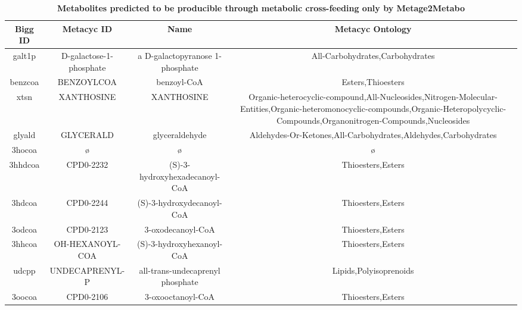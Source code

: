 \documentclass[../main.tex]{subfiles}
\begin{document}
\begin{table}[H]
\centering
\begin{adjustbox}{width=1.2\textwidth}
\begin{tabular}{|c|c|c|c|}
\hline
Bigg ID & Metacyc ID & Name & Metacyc Ontology  \\
\hline
galt1p&	D-galactose-1-phosphate&	a D-galactopyranose 1-phosphate	&All-Carbohydrates,Carbohydrates\\
benzcoa&	BENZOYLCOA&	benzoyl-CoA&	Esters,Thioesters\\
xtsn&	XANTHOSINE&	XANTHOSINE	&\begin{minipage}[t]{0.8\linewidth}Organic-heterocyclic-compound,All-Nucleosides,Nitrogen-Molecular-Entities,Organic-heteromonocyclic-compounds,Organic-Heteropolycyclic-Compounds,Organonitrogen-Compounds,Nucleosides\end{minipage}\\
glyald&	GLYCERALD&	glyceraldehyde	&Aldehydes-Or-Ketones,All-Carbohydrates,Aldehydes,Carbohydrates\\
3hocoa&	ø	&	ø	&	ø\\
3hhdcoa	&CPD0-2232	&(S)-3-hydroxyhexadecanoyl-CoA	&Thioesters,Esters\\
3hdcoa&	CPD0-2244	&(S)-3-hydroxydecanoyl-CoA	&Thioesters,Esters\\
3odcoa&	CPD0-2123&	3-oxodecanoyl-CoA	&Thioesters,Esters\\
3hhcoa&	OH-HEXANOYL-COA	&(S)-3-hydroxyhexanoyl-CoA&	Thioesters,Esters\\
udcpp&	UNDECAPRENYL-P	&all-trans-undecaprenyl phosphate	&Lipids,Polyisoprenoids\\
3oocoa&	CPD0-2106&	3-oxooctanoyl-CoA	&Thioesters,Esters\\
 \hline
\end{tabular}
\end{adjustbox}
\caption{\textbf{Metabolites predicted to be producible through metabolic cross-feeding only by Metage2Metabo}}
\label{table:added-value-M2M}
\end{table}
\end{document}
